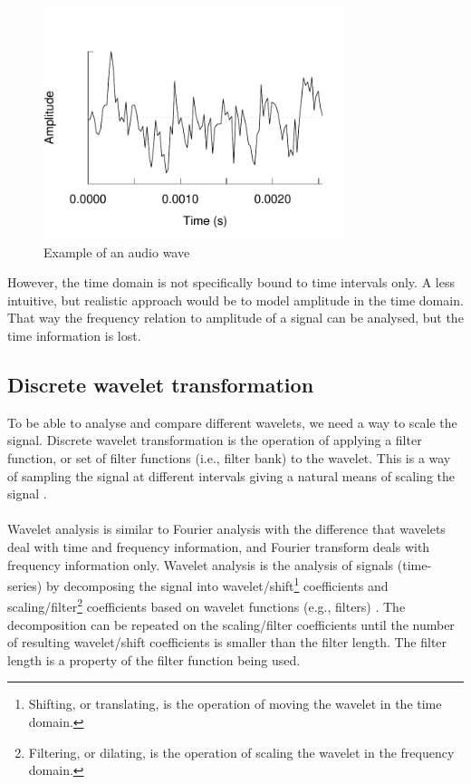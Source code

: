 \begin{figure}[h]
\caption{Example of an audio wave}\label{figure:wave}
\centering
	\includegraphics[height=192pt]{figures/pink_audio.pdf}
\end{figure}

However, the time domain is not specifically bound to time intervals only. A
less intuitive, but realistic approach would be to model amplitude in the time
domain. That way the frequency relation to amplitude of a signal can be
analysed, but the time information is lost.

\subsection{Discrete wavelet transformation}
To be able to analyse and compare different wavelets, we need a way to scale
the signal. Discrete wavelet transformation is the operation of applying a
filter function, or set of filter functions (i.e., filter bank) to the wavelet.
This is a way of sampling the signal at different intervals giving a natural
means of scaling the signal \cite{karus2013}.

\paragraph{}
Wavelet analysis is similar to Fourier analysis with the difference that
wavelets deal with time and frequency information, and Fourier transform deals
with frequency information only. Wavelet analysis is the analysis of signals
(time-series) by decomposing the signal into wavelet/shift\footnote{Shifting,
or translating, is the operation of moving the wavelet in the time domain.}
coefficients and scaling/filter\footnote{Filtering, or dilating, is the
operation of scaling the wavelet in the frequency domain.} coefficients based
on wavelet functions (e.g., filters) \cite{karus2013}. The decomposition can be
repeated on the scaling/filter coefficients until the number of resulting
wavelet/shift coefficients is smaller than the filter length. The filter length
is a property of the filter function being used.

